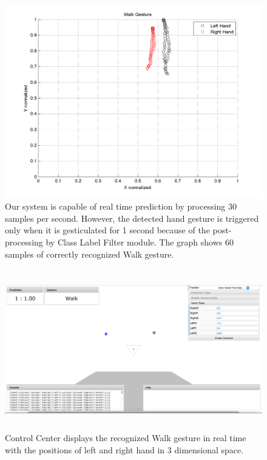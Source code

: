 \begin{figure}
	[h] \hspace{-15 mm} \centering 
	\includegraphics[width=155mm]{figures/result/test-walk.png} \caption{Our system is capable of real time prediction by processing 30 samples per second. However, the detected hand gesture is triggered only when it is gesticulated for 1 second because of the post-processing by Class Label Filter module. The graph shows 60 samples of correctly recognized Walk gesture. } \label{res:pl:walk} 
\end{figure}
\begin{figure}
	[h] \centering 
	\includegraphics[height=70mm]{figures/result/cc-walk.jpg} \caption{Control Center displays the recognized Walk gesture in real time with the positions of left and right hand in 3 dimensional space.} \label{res:cc:walk} 
\end{figure}
